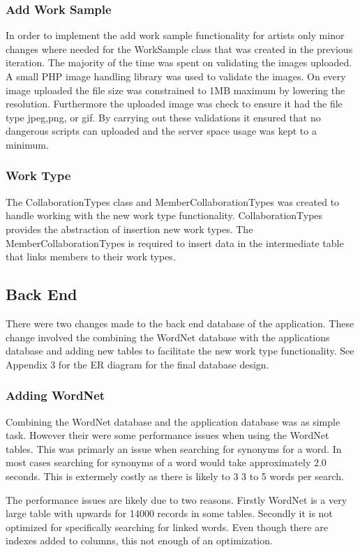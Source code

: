 \documentclass[a4paper,oneside,11pt]{report}
\begin{document}
\subsubsection{Add Work Sample}
In order to implement the add work sample functionality for artists only minor changes where needed for the WorkSample class that was created in the previous iteration. The majority of the time was spent on validating the images uploaded. A small PHP image handling library was used to validate the images. On every image uploaded the file size was constrained to 1MB maximum by lowering the resolution. Furthermore the uploaded image was check to ensure it had the file type jpeg,png, or gif. By carrying out these validations it ensured that no dangerous scripts can uploaded and the server space usage was kept to a minimum. 

\subsubsection{Work Type}
The CollaborationTypes class and MemberCollaborationTypes was created to handle working with the new work type functionality. CollaborationTypes provides the abstraction of insertion new work types. The MemberCollaborationTypes is required to insert data in the intermediate table that links members to their work types.

\subsection{Back End}
There were two changes made to the back end database of the application. These change involved the combining the WordNet database with the applications database and adding new tables to facilitate the new work type functionality. See Appendix 3 for the ER diagram for the final database design.

\subsubsection{Adding WordNet}
Combining the WordNet database and the application database was as simple task. 
However their were some performance issues when using the WordNet tables. This was primarly an issue when searching for synonyms for a word. In most cases searching for synonyms of a word would take approximately 2.0 seconds. This is extermely costly as there is likely to 3 3 to 5 words per search. 

The performance issues are likely due to two reasons. Firstly WordNet is a very large table with upwards for 14000 records in some tables. Secondly it is not optimized for specifically searching for linked words. Even though there are indexes added to columns, this not enough of an optimization.
\end{document}
